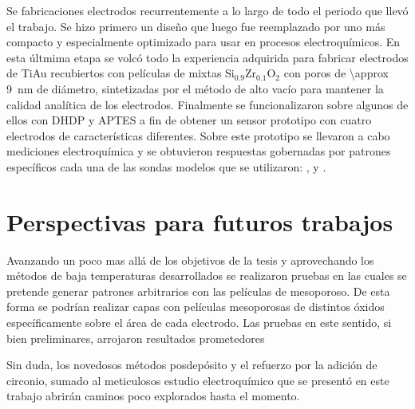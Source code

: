 Se fabricaciones electrodos recurrentemente a lo largo de todo el periodo que llevó el trabajo. Se hizo primero un diseño que luego fue reemplazado por uno más compacto y especialmente optimizado para usar en procesos electroquímicos. En esta últmima etapa se volcó todo la experiencia adquirida para fabricar electrodos de Ti\textbar Au recubiertos con películas de mixtas Si$_{0.9}$Zr$_{0.1}$O$_2$ con poros de \SI{\approx 9}{\nm} de diámetro, sintetizadas por el método de alto vacío para mantener la calidad analítica de los electrodos. Finalmente se funcionalizaron sobre algunos de ellos con DHDP y APTES a fin de obtener un sensor prototipo con cuatro electrodos de características diferentes. Sobre este prototipo se llevaron a cabo mediciones electroquímica y se obtuvieron respuestas gobernadas por patrones específicos cada una de las sondas modelos que se utilizaron: \ferroferri, \ferroceno\space y \aminorutenio.   



\section*{Perspectivas para futuros trabajos}


Avanzando un poco mas allá de los objetivos de la tesis y aprovechando los métodos de baja temperaturas desarrollados se realizaron pruebas en las cuales se pretende generar patrones arbitrarios con las películas de mesoporoso. De esta forma se podrían realizar capas con películas mesoporosas de distintos óxidos específicamente sobre el área de cada electrodo. Las pruebas en este sentido, si bien preliminares, arrojaron resultados prometedores

Sin duda, los novedosos métodos posdepósito y el refuerzo por la adición de circonio, sumado al meticulosos estudio electroquímico que se presentó en este trabajo abrirán caminos poco explorados hasta el momento.

